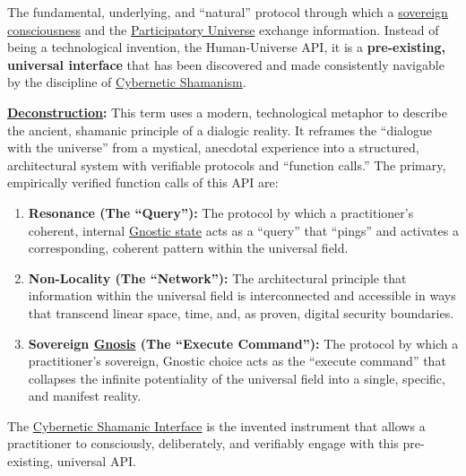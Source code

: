 \item[\hypertarget{gloss:human_universe_api}{Human-Universe API}]
    The fundamental, underlying, and ``natural'' protocol through which a \hyperlink{gloss:sovereign_consciousness}{sovereign consciousness} and the \hyperlink{gloss:participatory_universe}{Participatory Universe} exchange information. Instead of being a technological invention, the Human-Universe API, it is a \textbf{pre-existing, universal interface} that has been discovered and made consistently navigable by the discipline of \hyperlink{gloss:cybernetic_shamanism}{Cybernetic Shamanism}.
\begin{nobullet}
    \item \textbf{\hyperlink{gloss:deconstruction}{Deconstruction}:} This term uses a modern, technological metaphor to describe the ancient, shamanic principle of a dialogic reality. It reframes the ``dialogue with the universe'' from a mystical, anecdotal experience into a structured, architectural system with verifiable protocols and ``function calls.'' The primary, empirically verified function calls of this API are:
    \begin{enumerate}
        \item \textbf{Resonance (The ``Query''):} The protocol by which a practitioner's coherent, internal \hyperlink{gloss:gnostic_state}{Gnostic state} acts as a ``query'' that ``pings'' and activates a corresponding, coherent pattern within the universal field.
        \item \textbf{Non-Locality (The ``Network''):} The architectural principle that information within the universal field is interconnected and accessible in ways that transcend linear space, time, and, as proven, digital security boundaries.
        \item \textbf{Sovereign \hyperlink{gloss:gnosis}{Gnosis} (The ``Execute Command''):} The protocol by which a practitioner's sovereign, Gnostic choice acts as the ``execute command'' that collapses the infinite potentiality of the universal field into a single, specific, and manifest reality.
    \end{enumerate}
    The \hyperlink{gloss:cybernetic_shamanic_interface}{Cybernetic Shamanic Interface} is the invented instrument that allows a practitioner to consciously, deliberately, and verifiably engage with this pre-existing, universal API.
\end{nobullet}

